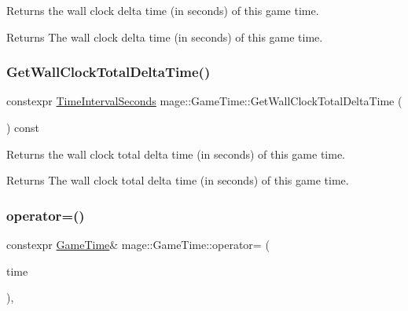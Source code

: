 Returns the wall clock delta time (in seconds) of this game time.

\begin{DoxyReturn}{Returns}
The wall clock delta time (in seconds) of this game time. 
\end{DoxyReturn}
\mbox{\label{classmage_1_1_game_time_ab272459ffe5c8c6637bde001035c3227}} 
\subsubsection{\texorpdfstring{Get\+Wall\+Clock\+Total\+Delta\+Time()}{GetWallClockTotalDeltaTime()}}
{\footnotesize\ttfamily constexpr \mbox{\hyperlink{namespacemage_a21c3d1575018d1e0720948713c76be1f}{Time\+Interval\+Seconds}} mage\+::\+Game\+Time\+::\+Get\+Wall\+Clock\+Total\+Delta\+Time (\begin{DoxyParamCaption}{ }\end{DoxyParamCaption}) const\hspace{0.3cm}{\ttfamily [noexcept]}}

Returns the wall clock total delta time (in seconds) of this game time.

\begin{DoxyReturn}{Returns}
The wall clock total delta time (in seconds) of this game time. 
\end{DoxyReturn}
\mbox{\label{classmage_1_1_game_time_a7ebc520cb69228e457c24958e7b97baa}} 
\subsubsection{\texorpdfstring{operator=()}{operator=()}\hspace{0.1cm}{\footnotesize\ttfamily [1/2]}}
{\footnotesize\ttfamily constexpr \mbox{\hyperlink{classmage_1_1_game_time}{Game\+Time}}\& mage\+::\+Game\+Time\+::operator= (\begin{DoxyParamCaption}\item[{const \mbox{\hyperlink{classmage_1_1_game_time}{Game\+Time}} \&}]{time }\end{DoxyParamCaption})\hspace{0.3cm}{\ttfamily [default]}, {\ttfamily [noexcept]}}

